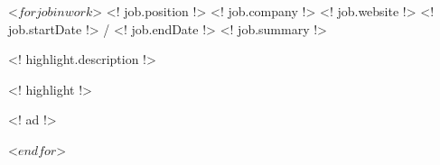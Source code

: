 \begin{cventries}
 <$ for job in work $>
  \cventry
    {<! job.position !>}
    {<! job.company !>}
    {<! job.website !>}
    {<! job.startDate !> / <! job.endDate !>}
    {<! job.summary !>}
    {
          \begin{cvitems}
                    \item{<! highlight.description !>}
                    \item{<! highlight !>}
                    \begin{cvitemssub}
                        \item{<! ad !>}
                    \end{cvitemssub}
          \end{cvitems}
    }
 <$ endfor $>
\end{cventries}
